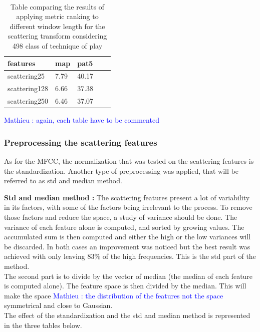 \documentclass[hidelinks,12pt]{report}
\newcommand{\ml}[1]{\textcolor{blue}{ Mathieu : #1}}
\begin{document}
\begin{table} [H]
\begin{center} 
\ 
 \setlength{\tabcolsep}{.16667em} 
\begin{tabular}{ | l | l | l | l | l |}
features & map & pat5  \\ 
\hline 
scattering25 &  7.79 & 40.17  \\ 

scattering128  &  6.66 & 37.38 \\ 

scattering250  &  6.46 & 37.07 \\ 
 
\end{tabular} 
\end{center} 
\caption{Table comparing the results of applying metric ranking to different window length for the scattering transform considering 498 class of technique of play} 
\label{you} 
\end{table}

\ml{again, each table have to be commented}

\subsubsection{Preprocessing the scattering features}
As for the MFCC, the normalization that was tested on the scattering features is the standardization. Another type of preprocessing was applied, that will be referred to as std and median method.\par
\textbf{Std and median method :} The scattering features present a lot of variability in its factors, with some of the factors being irrelevant to the process. To remove those factors and reduce the space, a study of variance should be done. The variance of each feature alone is computed, and sorted by growing values. The accumulated sum is then computed and either the high or the low variances will be discarded. In both cases an improvement was noticed but the best result was achieved with only leaving 83\% of the high frequencies. This is the std part of the method. \\
The second part is to divide by the vector of median (the median of each feature is computed alone). The feature space is then divided by the median. This will make the space \ml{the distribution of the features not the space} symmetrical and close to Gaussian.\\
The effect of the standardization and the std and median method is represented in the three tables below.
\end{document}
